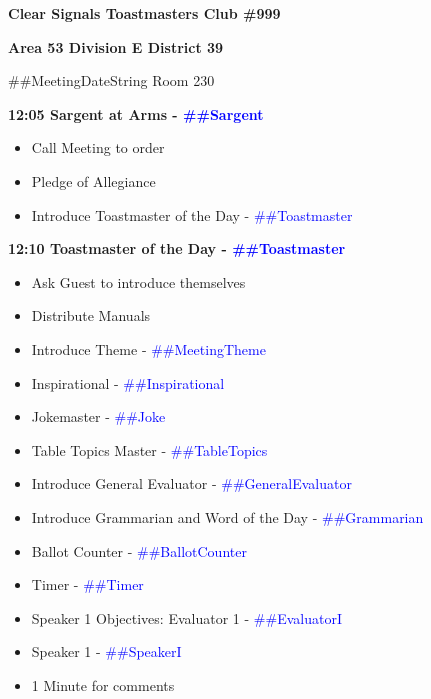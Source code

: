 \documentclass{article}
\newcommand{\meetingTheme}{##MeetingTheme}
\newcommand{\meetingDateString}{##MeetingDateString}
\newcommand{\toastmaster}{##Toastmaster}
\newcommand{\sargent}{##Sargent}
\newcommand{\tableTopics}{##TableTopics}
\newcommand{\generalEvaluator}{##GeneralEvaluator}
\newcommand{\evaluatorI}{##EvaluatorI}
\newcommand{\speakerI}{##SpeakerI}
\newcommand{\grammarian}{##Grammarian}
\newcommand{\timer}{##Timer}
\newcommand{\inspirational}{##Inspirational}
\newcommand{\ballotCounter}{##BallotCounter}
\newcommand{\joke}{##Joke}
\newcommand{\speechITitle}{##SpeechITitle}
\newcommand{\speechIProject}{##SpeechIProject}
\newcommand{\speechITimeConstraints}{##SpeechITimeConstraints}
\begin{document}
  \begin{spacing}{.8}
  \begin{center}
    {\bf Clear Signals Toastmasters Club \#999}
	
	{\bf Area 53 Division E District 39}
	
	\meetingDateString{} Room 230  
  \end{center}
  {\Large \bf12:05 Sargent at Arms - \textcolor{blue}{\sargent{}}}
  \begin{itemize}
    \item Call Meeting to order
    \item Pledge of Allegiance
    \item Introduce Toastmaster of the Day - \textcolor{blue}{\toastmaster{}}
  \end{itemize}
  {\Large \bf12:10 Toastmaster of the Day - \textcolor{blue}{\toastmaster{}}} 
  \begin{itemize}
    \item Ask Guest to introduce themselves
    \item Distribute Manuals
    \item Introduce Theme - \textcolor{blue}{\meetingTheme{}}
    \item Inspirational - \textcolor{blue}{\inspirational{}}
    \item Jokemaster - \textcolor{blue}{\joke{}}
	\item Table Topics Master - \textcolor{blue}{\tableTopics{}}
    \item Introduce General Evaluator - \textcolor{blue}{\generalEvaluator{}}
	\item Introduce Grammarian and Word of the Day - \textcolor{blue}{\grammarian{}}
    \item Ballot Counter - \textcolor{blue}{\ballotCounter{}}
    \item Timer - \textcolor{blue}{\timer{}}
    \item Speaker 1 Objectives: Evaluator 1 - \textcolor{blue}{\evaluatorI{}}
    \item Speaker 1 - \textcolor{blue}{\speakerI{}}
    \item 1 Minute for comments

\end{itemize}
\end{spacing}
\end{document}
